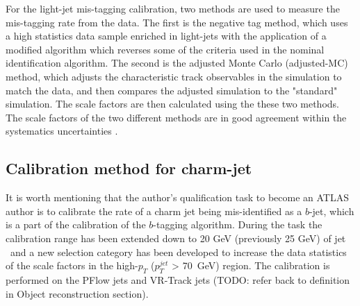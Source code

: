 \documentclass[letterpaper,12pt]{article}
\begin{document}
For the light-jet mis-tagging calibration, two methods are 
used to measure the mis-tagging rate from the data. The first is the 
negative tag method, which uses a high statistics data sample enriched 
in light-jets with the application of a modified algorithm which 
reverses some of the criteria used in the nominal identification 
algorithm.
The second is the adjusted Monte Carlo (adjusted-MC) method, which 
adjusts the characteristic track observables in the simulation 
to match the data, and then compares the adjusted simulation to the 
"standard" simulation. The scale factors are then calculated using 
the these two methods. The scale factors of the two different methods 
are in good agreement within the systematics uncertainties \cite{ATLAS-CONF-2018-006}. 



\subsection{Calibration method for charm-jet}


\label{sec:Introduction}
It is worth mentioning that the author's qualification task to become an ATLAS author is to 
calibrate the rate of a charm jet being mis-identified as a $b$-jet, which is a part 
of the calibration of the $b$-tagging algorithm.
During the task the calibration range has been extended down to 20 GeV (previously 25 GeV) of
jet \pt\ and a new selection category has been developed 
to increase the data statistics of the scale factors in the 
high-$p_T$ ($p_T^{jet}$ > 70~GeV) region.
The calibration is performed on the PFlow jets and VR-Track jets (TODO: refer back to definition in Object reconstruction section). 
\end{document}
